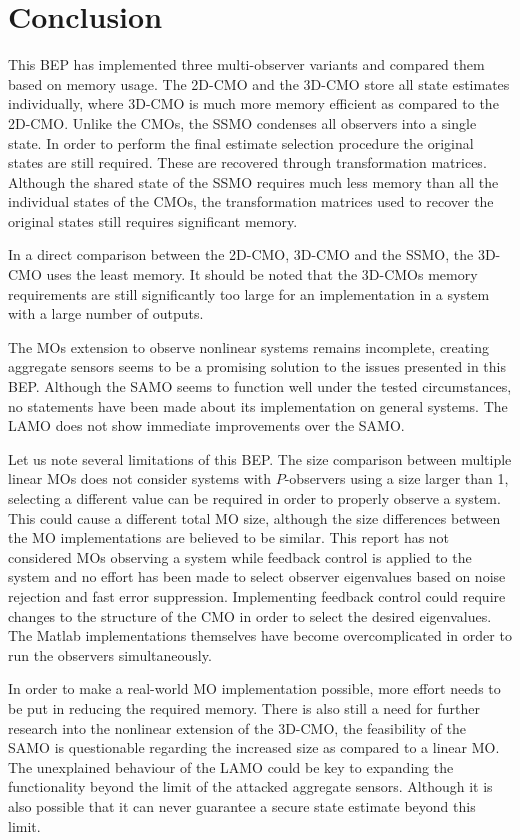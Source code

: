 \section{Conclusion}
This BEP has implemented three multi-observer variants and compared them based on memory usage. The 2D-CMO and the 3D-CMO store all state estimates individually, where 3D-CMO is much more memory efficient as compared to the 2D-CMO. Unlike the CMOs, the SSMO condenses all observers into a single state. In order to perform the final estimate selection procedure the original states are still required. These are recovered through transformation matrices. Although the shared state of the SSMO requires much less memory than all the individual states of the CMOs, the transformation matrices used to recover the original states still requires significant memory. 

In a direct comparison between the 2D-CMO, 3D-CMO and the SSMO, the 3D-CMO uses the least memory. It should be noted that the 3D-CMOs memory requirements are still significantly too large for an implementation in a system with a large number of outputs.

The MOs extension to observe nonlinear systems remains incomplete, creating aggregate sensors seems to be a promising solution to the issues presented in this BEP. Although the SAMO seems to function well under the tested circumstances, no statements have been made about its implementation on general systems. The LAMO does not show immediate improvements over the SAMO.

Let us note several limitations of this BEP. The size comparison between multiple linear MOs does not consider systems with $P$-observers using a size larger than 1, selecting a different value can be required in order to properly observe a system. This could cause a different total MO size, although the size differences between the MO implementations are believed to be similar. This report has not considered MOs observing a system while feedback control is applied to the system and no effort has been made to select observer eigenvalues based on noise rejection and fast error suppression. Implementing feedback control could require changes to the structure of the CMO in order to select the desired eigenvalues. The Matlab implementations themselves have become overcomplicated in order to run the observers simultaneously.

In order to make a real-world MO implementation possible, more effort needs to be put in reducing the required memory. There is also still a need for further research into the nonlinear extension of the 3D-CMO, the feasibility of the SAMO is questionable regarding the increased size as compared to a linear MO. The unexplained behaviour of the LAMO could be key to expanding the functionality beyond the limit of the attacked aggregate sensors. Although it is also possible that it can never guarantee a secure state estimate beyond this limit.